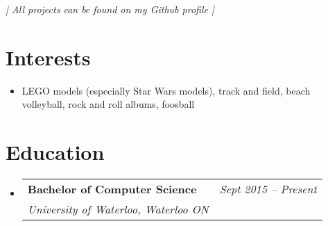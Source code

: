 \documentclass[letterpaper,10pt]{article}
\makeatletter
\newcommand{\resumeSubheading}[4]{
  \vspace{-1pt}\item
    \begin{tabular*}{0.97\textwidth}{l@{\extracolsep{\fill}}r}
      \textbf{#1} & #2 \\
      \textit{\small#3} & \textit{\small #4} \\
    \end{tabular*}\vspace{-5pt}
}
\newcommand{\resumeSubHeadingListStart}{\begin{itemize}[leftmargin=*]}
\newcommand{\resumeSubHeadingListEnd}{\end{itemize}}
\makeatother
\begin{document}
    

    

\begin{center}
\textit{| All projects can be found on my Github profile |}
\end{center}

\section{Interests}
  
      \vspace{0.125cm}
    \resumeSubHeadingListStart
    \item {LEGO models (especially Star Wars models), track and field, beach volleyball, rock and roll albums, foosball}
  \resumeSubHeadingListEnd

\vspace{-0.2cm}
\section{Education}

\vspace{0.125cm}
  \resumeSubHeadingListStart
    \resumeSubheading
      {Bachelor of Computer Science}{\textit{Sept 2015 -- Present}}
      {University of Waterloo, Waterloo ON}{}

  \resumeSubHeadingListEnd
\end{document}
